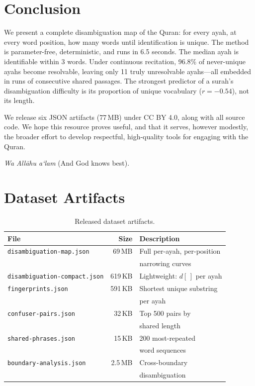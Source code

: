 \documentclass[11pt,a4paper]{article}
\begin{document}
\section{Conclusion}

We present a complete disambiguation map of the Quran: for every ayah, at every word position, how many words until identification is unique.
The method is parameter-free, deterministic, and runs in 6.5 seconds.
The median ayah is identifiable within 3 words.
Under continuous recitation, 96.8\% of never-unique ayahs become resolvable, leaving only 11 truly unresolvable ayahs---all embedded in runs of consecutive shared passages.
The strongest predictor of a surah's disambiguation difficulty is its proportion of unique vocabulary ($r = -0.54$), not its length.

We release six JSON artifacts (77\,MB) under CC BY 4.0, along with all source code.
We hope this resource proves useful, and that it serves, however modestly, the broader effort to develop respectful, high-quality tools for engaging with the Quran.

\emph{Wa All\=ahu a`lam} (And God knows best).




\clearpage
\appendix

\section{Dataset Artifacts}
\label{app:datasets}

\begin{table}[h]
\centering
\small
\begin{tabular}{lrl}
\toprule
\textbf{File} & \textbf{Size} & \textbf{Description} \\
\midrule
\texttt{disambiguation-map.json} & 69\,MB & Full per-ayah, per-position \\
 & & narrowing curves \\
\texttt{disambiguation-compact.json} & 619\,KB & Lightweight: $d[\,]$ per ayah \\
\texttt{fingerprints.json} & 591\,KB & Shortest unique substring \\
 & & per ayah \\
\texttt{confuser-pairs.json} & 32\,KB & Top 500 pairs by \\
 & & shared length \\
\texttt{shared-phrases.json} & 15\,KB & 200 most-repeated \\
 & & word sequences \\
\texttt{boundary-analysis.json} & 2.5\,MB & Cross-boundary \\
 & & disambiguation \\
\bottomrule
\end{tabular}
\caption{Released dataset artifacts.}
\label{tab:artifacts}
\end{table}
\end{document}
